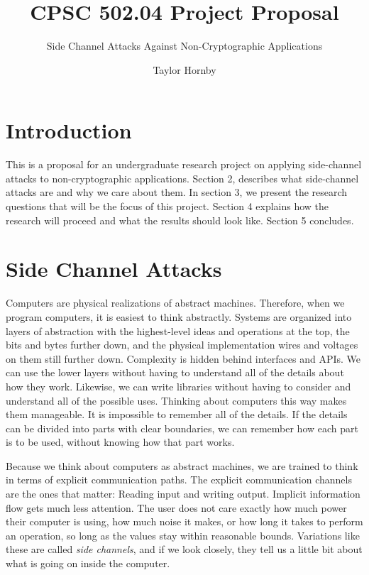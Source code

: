 \documentclass{acm_proc_article-sp}
\begin{document}
\title{CPSC 502.04 Project Proposal}
\subtitle{Side Channel Attacks Against Non-Cryptographic Applications}


\author{
\alignauthor
Taylor Hornby
}

\maketitle

\section{Introduction}

This is a proposal for an undergraduate research project on applying
side-channel attacks to non-cryptographic applications. Section 2, describes
what side-channel attacks are and why we care about them. In section 3, we
present the research questions that will be the focus of this project. Section
4 explains how the research will proceed and what the results should look like.
Section 5 concludes.


\section{Side Channel Attacks}

Computers are physical realizations of abstract machines. Therefore, when we
program computers, it is easiest to think abstractly. Systems are organized into
layers of abstraction with the highest-level ideas and operations at the top,
the bits and bytes further down, and the physical implementation \textendash
wires and voltages on them \textendash still further down. Complexity is hidden
behind interfaces and APIs. We can use the lower layers without having to
understand all of the details about how they work. Likewise, we can write
libraries without having to consider and understand all of the possible uses.
Thinking about computers this way makes them manageable. It is impossible to
remember all of the details. If the details can be divided into parts with clear
boundaries, we can remember how each part is to be used, without knowing how
that part works.

Because we think about computers as abstract machines, we are trained to think
in terms of explicit communication paths. The explicit communication channels
are the ones that matter: Reading input and writing output. Implicit information
flow gets much less attention. The user does not care exactly how much power
their computer is using, how much noise it makes, or how long it takes to
perform an operation, so long as the values stay within reasonable bounds.
Variations like these are called \emph{side channels}, and if we look closely,
they tell us a little bit about what is going on inside the computer.
\end{document}
